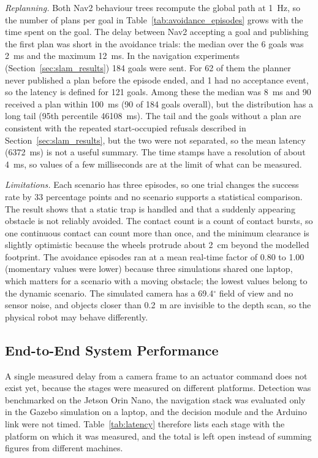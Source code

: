 \noindent\textit{Replanning.} Both Nav2 behaviour trees recompute the global path at 1~Hz, so the number of plans per goal in Table~\ref{tab:avoidance_episodes} grows with the time spent on the goal. The delay between Nav2 accepting a goal and publishing the first plan was short in the avoidance trials: the median over the 6 goals was 2~ms and the maximum 12~ms. In the navigation experiments (Section~\ref{sec:slam_results}) 184 goals were sent. For 62 of them the planner never published a plan before the episode ended, and 1 had no acceptance event, so the latency is defined for 121 goals. Among these the median was 8~ms and 90 received a plan within 100~ms (90 of 184 goals overall), but the distribution has a long tail (95th percentile 46108~ms). The tail and the goals without a plan are consistent with the repeated start-occupied refusals described in Section~\ref{sec:slam_results}, but the two were not separated, so the mean latency (6372~ms) is not a useful summary. The time stamps have a resolution of about 4~ms, so values of a few milliseconds are at the limit of what can be measured.

\noindent\textit{Limitations.} Each scenario has three episodes, so one trial changes the success rate by 33 percentage points and no scenario supports a statistical comparison. The result shows that a static trap is handled and that a suddenly appearing obstacle is not reliably avoided. The contact count is a count of contact bursts, so one continuous contact can count more than once, and the minimum clearance is slightly optimistic because the wheels protrude about 2~cm beyond the modelled footprint. The avoidance episodes ran at a mean real-time factor of 0.80 to 1.00 (momentary values were lower) because three simulations shared one laptop, which matters for a scenario with a moving obstacle; the lowest values belong to the dynamic scenario. The simulated camera has a 69.4$^{\circ}$ field of view and no sensor noise, and objects closer than 0.2~m are invisible to the depth scan, so the physical robot may behave differently.

\subsection{End-to-End System Performance}
\label{subsec:e2e}

A single measured delay from a camera frame to an actuator command does not exist yet, because the stages were measured on different platforms. Detection was benchmarked on the Jetson Orin Nano, the navigation stack was evaluated only in the Gazebo simulation on a laptop, and the decision module and the Arduino link were not timed. Table~\ref{tab:latency} therefore lists each stage with the platform on which it was measured, and the total is left open instead of summing figures from different machines.

